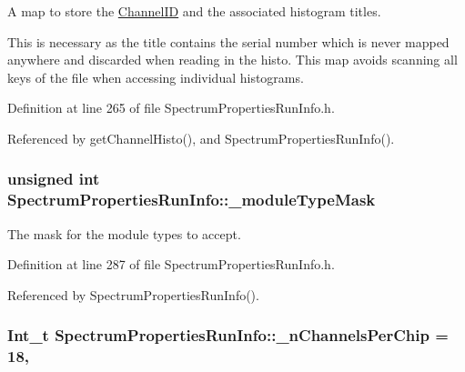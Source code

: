 A map to store the \hyperlink{class_spectrum_properties_run_info_1_1_channel_i_d}{Channel\-I\-D} and the associated histogram titles. 

This is necessary as the title contains the serial number which is never mapped anywhere and discarded when reading in the histo. This map avoids scanning all keys of the file when accessing individual histograms. 

Definition at line 265 of file Spectrum\-Properties\-Run\-Info.\-h.



Referenced by get\-Channel\-Histo(), and Spectrum\-Properties\-Run\-Info().

\hypertarget{class_spectrum_properties_run_info_a4d7328dfa2acc72cbaaf1b897c975b62}{
\subsubsection[{\-\_\-module\-Type\-Mask}]{\setlength{\rightskip}{0pt plus 5cm}unsigned int Spectrum\-Properties\-Run\-Info\-::\-\_\-module\-Type\-Mask\hspace{0.3cm}{\ttfamily [protected]}}}\label{class_spectrum_properties_run_info_a4d7328dfa2acc72cbaaf1b897c975b62}


The mask for the module types to accept. 



Definition at line 287 of file Spectrum\-Properties\-Run\-Info.\-h.



Referenced by Spectrum\-Properties\-Run\-Info().

\hypertarget{class_spectrum_properties_run_info_ac56bc4e28473056ac6daad4a7645fbf9}{
\subsubsection[{\-\_\-n\-Channels\-Per\-Chip}]{\setlength{\rightskip}{0pt plus 5cm}Int\-\_\-t Spectrum\-Properties\-Run\-Info\-::\-\_\-n\-Channels\-Per\-Chip = 18\hspace{0.3cm}{\ttfamily [static]}, {\ttfamily [protected]}}}\label{class_spectrum_properties_run_info_ac56bc4e28473056ac6daad4a7645fbf9}


